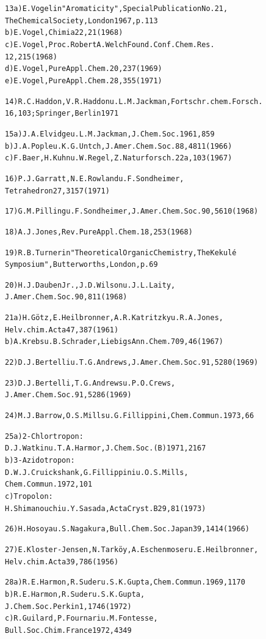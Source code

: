 \documentclass[a4paper,11pt]{article}
\begin{document}
\begin{alltt}
13 a) E.Vogel in "Aromaticity", Special Publication No. 21,
      The Chemical Society, London 1967, p. 113
   b) E.Vogel, Chimia 22, 21 (1968)
   c) E.Vogel, Proc.Robert A.Welch Found.Conf.Chem.Res.
      12, 215 (1968)
   d) E.Vogel, Pure Appl.Chem. 20, 237 (1969)
   e) E.Vogel, Pure Appl.Chem. 28, 355 (1971)

14)   R.C.Haddon, V.R.Haddon u. L.M.Jackman, Fortschr.chem.Forsch.
      16, 103; Springer, Berlin 1971

15 a) J.A.Elvidge u. L.M.Jackman, J.Chem.Soc. 1961, 859
   b) J.A.Pople u. K.G.Untch, J.Amer.Chem.Soc. 88, 4811 (1966)
   c) F.Baer, H.Kuhn u. W.Regel, Z.Naturforsch. 22a, 103 (1967)

16)   P.J.Garratt, N.E.Rowland u. F.Sondheimer,
      Tetrahedron 27, 3157 (1971)

17)   G.M.Pilling u. F.Sondheimer, J.Amer.Chem.Soc. 90, 5610 (1968)

18)   A.J.Jones, Rev.Pure Appl.Chem. 18, 253 (1968)

19)   R.B.Turner in "Theoretical Organic Chemistry, The Kekulé
      Symposium", Butterworths, London, p. 69

20)   H.J.Dauben Jr., J.D.Wilson u. J.L.Laity,
      J.Amer.Chem.Soc. 90, 811 (1968)

21 a) H.Götz, E.Heilbronner, A.R.Katritzky u. R.A.Jones,
      Helv.chim.Acta 47, 387 (1961)
   b) A.Krebs u. B.Schrader, Liebigs Ann.Chem. 709, 46 (1967)

22)   D.J.Bertelli u. T.G.Andrews, J.Amer.Chem.Soc. 91, 5280 (1969)
\newpage
{}


23)   D.J.Bertelli, T.G.Andrews u. P.O.Crews,
      J.Amer.Chem.Soc. 91, 5286 (1969)

24)   M.J.Barrow, O.S.Mills u. G.Fillippini, Chem.Commun. 1973, 66

25 a) 2-Chlortropon:
      D.J.Watkin u. T.A.Harmor, J.Chem.Soc. (B) 1971, 2167
   b) 3-Azidotropon:
      D.W.J.Cruickshank, G.Fillippini u. O.S.Mills,
      Chem.Commun. 1972, 101
   c) Tropolon:
      H.Shimanouchi u. Y.Sasada, Acta Cryst. B 29, 81 (1973)

26)   H.Hosoya u. S.Nagakura, Bull.Chem.Soc.Japan 39, 1414 (1966)

27)   E.Kloster-Jensen, N.Tarköy, A.Eschenmoser u. E.Heilbronner,
      Helv.chim.Acta 39, 786 (1956)

28 a) R.E.Harmon, R.Suder u. S.K.Gupta, Chem.Commun. 1969, 1170
   b) R.E.Harmon, R.Suder u. S.K.Gupta,
      J.Chem.Soc.Perkin 1, 1746 (1972)
   c) R.Guilard, P.Fournari u. M.Fontesse,
      Bull.Soc.Chim.France 1972, 4349


\end{alltt}
\end{document}
